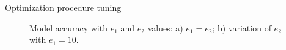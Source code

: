 \documentclass[12pt, aspectratio=169]{beamer}
\begin{document}
\begin{frame}{Optimization procedure tuning}

\fontsize{8}{5}\selectfont
    \begin{figure}
    \caption*{\fontsize{11}{5}\selectfont
    Model accuracy with $e_1$ and $e_2$ values: a) $e_1 = e_2$; b) variation of $e_2$ with $e_1 =10$.}
    \vspace{-0.2 cm}
    \begin{minipage}[h]{0.45\linewidth}
    \end{minipage}
    \begin{minipage}[h]{0.45\linewidth}
    \center{
}
\end{minipage}
\end{figure}
\end{frame}
\end{document}
